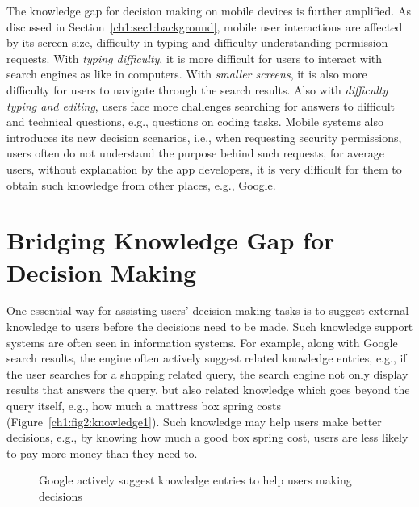 The knowledge gap for decision making on mobile devices is further amplified. As discussed in Section~\ref{ch1:sec1:background}, mobile user interactions are affected by its screen size, difficulty in typing and difficulty understanding permission requests. With \emph{typing difficulty}, it is more difficult for users to interact with search engines as like in computers. With \emph{smaller screens}, it is also more difficulty for users to navigate through the search results. Also with \emph{difficulty typing and editing}, users face more challenges searching for answers to difficult and technical questions, e.g., questions on coding tasks. Mobile systems also introduces its new decision scenarios, i.e., when requesting security permissions, users often do not understand the purpose behind such requests, for average users, without explanation by the app developers, it is very difficult for them to obtain such knowledge from other places, e.g., Google.

\section{Bridging Knowledge Gap for Decision Making}

One essential way for assisting users' decision making tasks is to suggest external knowledge to users before the decisions need to be made. Such knowledge support systems are often seen in information systems. For example, along with Google search results, the engine often actively suggest related knowledge entries, e.g., if the user searches for a shopping related query, the search engine not only display results that answers the query, but also related knowledge which goes beyond the query itself, e.g., how much a mattress box spring costs (Figure~\ref{ch1:fig2:knowledge1}). Such knowledge may help users make better decisions, e.g., by knowing how much a good box spring cost, users are less likely to pay more money than they need to. 

\begin{figure}[h]
\centering
{}\hfill
{}
\caption{Google actively suggest knowledge entries to help users making decisions}
\end{figure}

